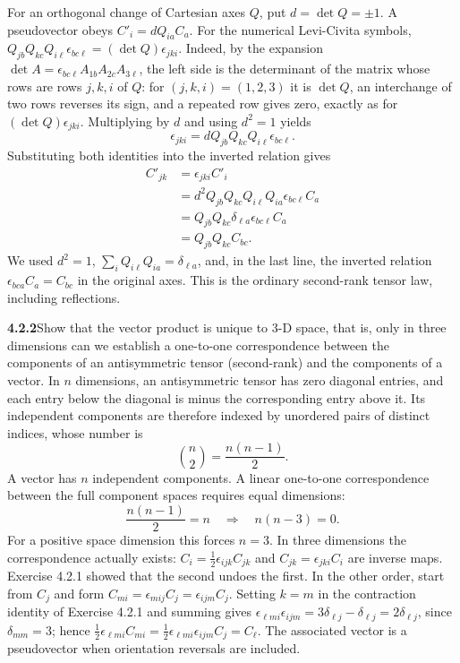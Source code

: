For an orthogonal change of Cartesian axes $Q$, put $d=\det Q=\pm1$.
A pseudovector obeys $C'_i=dQ_{ia}C_a$. For the numerical Levi-Civita
symbols,
$Q_{jb}Q_{kc}Q_{i\ell}\epsilon_{bc\ell}=(\det Q)\epsilon_{jki}$.
Indeed, by the expansion $\det A=\epsilon_{bc\ell}A_{1b}A_{2c}A_{3\ell}$,
the left side is the determinant of the matrix whose rows are rows
$j,k,i$ of $Q$: for $(j,k,i)=(1,2,3)$ it is $\det Q$, an interchange of
two rows reverses its sign, and a repeated row gives zero, exactly as
for $(\det Q)\epsilon_{jki}$. Multiplying by $d$ and using $d^2=1$ yields
\[
\epsilon_{jki}=dQ_{jb}Q_{kc}Q_{i\ell}\epsilon_{bc\ell}.
\]
Substituting both identities into the inverted relation gives
\begin{align*}
C'_{jk}
&=\epsilon_{jki}C'_i\\
&=d^2Q_{jb}Q_{kc}Q_{i\ell}Q_{ia}\epsilon_{bc\ell}C_a\\
&=Q_{jb}Q_{kc}\delta_{\ell a}\epsilon_{bc\ell}C_a\\
&=Q_{jb}Q_{kc}C_{bc}.
\end{align*}
We used $d^2=1$, $\sum_iQ_{i\ell}Q_{ia}=\delta_{\ell a}$, and, in the
last line, the inverted relation $\epsilon_{bca}C_a=C_{bc}$ in the
original axes.
This is the ordinary second-rank tensor law, including reflections.

\par\bigskip
\noindent\textbf{4.2.2}\quad Show that the vector product is unique to 3-D
space, that is, only in three dimensions can we establish a
 one-to-one correspondence between the components of an
antisymmetric tensor (second-rank) and the components of a vector.
\solution
In $n$ dimensions, an antisymmetric tensor has zero diagonal
entries, and each entry below the diagonal is minus the corresponding
entry above it. Its independent components are therefore indexed by
unordered pairs of distinct indices, whose number is
\[
\binom n2=\frac{n(n-1)}2.
\]
A vector has $n$ independent components. A linear one-to-one
correspondence between the full component spaces requires equal
dimensions:
\[
\frac{n(n-1)}2=n
\quad\Longrightarrow\quad n(n-3)=0.
\]
For a positive space dimension this forces $n=3$. In three dimensions
the correspondence actually exists: $C_i=\tfrac12\epsilon_{ijk}C_{jk}$
and $C_{jk}=\epsilon_{jki}C_i$ are inverse maps. Exercise 4.2.1 showed
that the second undoes the first. In the other order, start from $C_j$
and form $C_{mi}=\epsilon_{mij}C_j=\epsilon_{ijm}C_j$. Setting $k=m$ in
the contraction identity of Exercise 4.2.1 and summing gives
$\epsilon_{\ell mi}\epsilon_{ijm}=3\delta_{\ell j}-\delta_{\ell j}
=2\delta_{\ell j}$, since $\delta_{mm}=3$; hence
$\tfrac12\epsilon_{\ell mi}C_{mi}
=\tfrac12\epsilon_{\ell mi}\epsilon_{ijm}C_j=C_\ell$.
The associated vector is a pseudovector when orientation reversals are
included.

